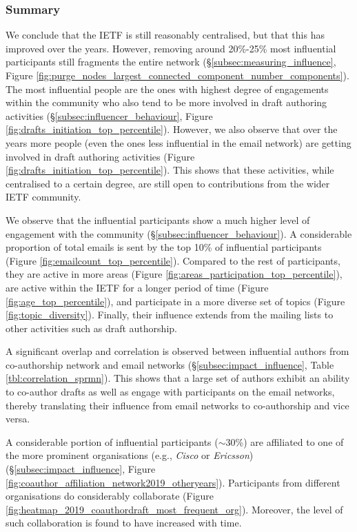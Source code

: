 \documentclass[twocolumn,10pt]{article}
\begin{document}
\subsubsection{Summary}


We conclude that the IETF is still reasonably centralised, but that this
has improved over the years. However, removing around 20\%-25\% most
influential participants still fragments the entire network
(\S\ref{subsec:measuring_influence}, Figure
\ref{fig:purge_nodes_largest_connected_component_number_components}). The
most influential people are the ones with highest degree of engagements
within the community who also tend to be more involved in draft authoring
activities (\S\ref{subsec:influencer_behaviour}, Figure
\ref{fig:drafts_initiation_top_percentile}). However, we also observe that
over the years more people (even the ones less influential in the email
network) are getting involved in draft authoring activities (Figure
\ref{fig:drafts_initiation_top_percentile}). This shows that these
activities, while centralised to a certain degree, are still open to
contributions from the wider IETF community.

We observe that the influential participants show a much higher level of
engagement with the community (\S\ref{subsec:influencer_behaviour}). A
considerable proportion of total emails is sent by the top 10\% of
influential participants (Figure \ref{fig:emailcount_top_percentile}).
Compared to the rest of participants, they are active in more areas (Figure
\ref{fig:areas_participation_top_percentile}), are active within the IETF
for a longer period of time (Figure \ref{fig:age_top_percentile}), and
participate in a more diverse set of topics (Figure
\ref{fig:topic_diversity}). Finally, their influence extends from the
mailing lists to other activities such as draft authorship.

A significant overlap and correlation is observed between
influential authors from co-authorship network and email networks
(\S\ref{subsec:impact_influence}, Table \ref{tbl:correlation_sprmn}). This
shows that a large set of authors exhibit an ability to co-author drafts as
well as engage with participants on the email networks, thereby translating
their influence from email networks to co-authorship and vice versa. 

A considerable portion of influential participants ($\sim$30\%) are
affiliated to one of the more prominent organisations (e.g., \emph{Cisco}
or \emph{Ericsson}) (\S\ref{subsec:impact_influence}, Figure
\ref{fig:coauthor_affiliation_network2019_otheryears}). Participants from
different organisations do considerably collaborate (Figure
\ref{fig:heatmap_2019_coauthordraft_most_frequent_org}). Moreover, the
level of such collaboration is found to have increased with time. 
\end{document}
